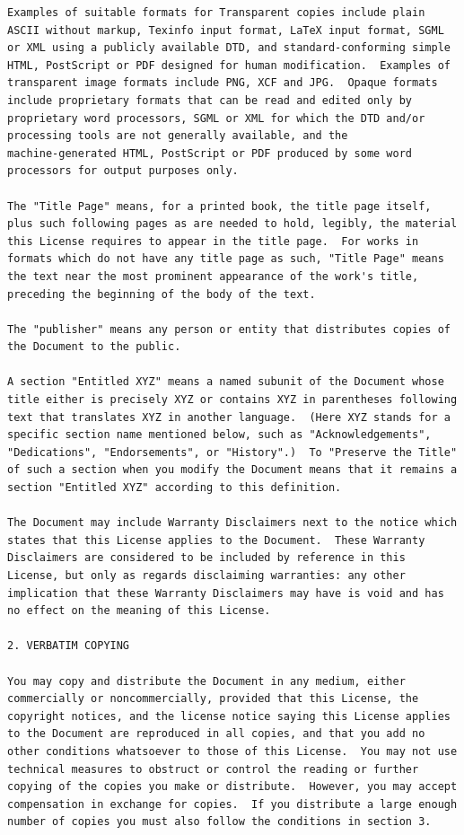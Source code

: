 \documentclass[a4paper]{report}
\begin{document}
\begin{verbatim}
Examples of suitable formats for Transparent copies include plain
ASCII without markup, Texinfo input format, LaTeX input format, SGML
or XML using a publicly available DTD, and standard-conforming simple
HTML, PostScript or PDF designed for human modification.  Examples of
transparent image formats include PNG, XCF and JPG.  Opaque formats
include proprietary formats that can be read and edited only by
proprietary word processors, SGML or XML for which the DTD and/or
processing tools are not generally available, and the
machine-generated HTML, PostScript or PDF produced by some word
processors for output purposes only.

The "Title Page" means, for a printed book, the title page itself,
plus such following pages as are needed to hold, legibly, the material
this License requires to appear in the title page.  For works in
formats which do not have any title page as such, "Title Page" means
the text near the most prominent appearance of the work's title,
preceding the beginning of the body of the text.

The "publisher" means any person or entity that distributes copies of
the Document to the public.

A section "Entitled XYZ" means a named subunit of the Document whose
title either is precisely XYZ or contains XYZ in parentheses following
text that translates XYZ in another language.  (Here XYZ stands for a
specific section name mentioned below, such as "Acknowledgements",
"Dedications", "Endorsements", or "History".)  To "Preserve the Title"
of such a section when you modify the Document means that it remains a
section "Entitled XYZ" according to this definition.

The Document may include Warranty Disclaimers next to the notice which
states that this License applies to the Document.  These Warranty
Disclaimers are considered to be included by reference in this
License, but only as regards disclaiming warranties: any other
implication that these Warranty Disclaimers may have is void and has
no effect on the meaning of this License.

2. VERBATIM COPYING

You may copy and distribute the Document in any medium, either
commercially or noncommercially, provided that this License, the
copyright notices, and the license notice saying this License applies
to the Document are reproduced in all copies, and that you add no
other conditions whatsoever to those of this License.  You may not use
technical measures to obstruct or control the reading or further
copying of the copies you make or distribute.  However, you may accept
compensation in exchange for copies.  If you distribute a large enough
number of copies you must also follow the conditions in section 3.


\end{verbatim}
\end{document}
